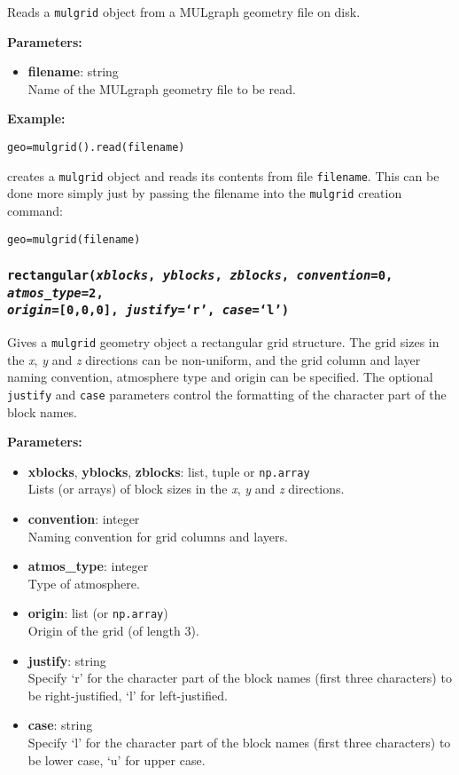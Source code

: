 Reads a \texttt{mulgrid} object from a MULgraph geometry file on disk.

\textbf{Parameters:}
\begin{itemize}
\item \textbf{filename}: string\\
  Name of the MULgraph geometry file to be read.
\end{itemize}

\textbf{Example:}

\begin{verbatim}
geo=mulgrid().read(filename)
\end{verbatim}

creates a \texttt{mulgrid} object and reads its contents from file \texttt{filename}.  This can be done more simply just by passing the filename into the \texttt{mulgrid} creation command:

\begin{verbatim}
geo=mulgrid(filename)
\end{verbatim}

\subsubsection{\texttt{rectangular(\emph{xblocks}, \emph{yblocks}, \emph{zblocks}, \emph{convention}=0, \emph{atmos\_type}=2,\\
    \emph{origin}=[0,0,0], \emph{justify}=`r', \emph{case}=`l')}}

Gives a \texttt{mulgrid} geometry object a rectangular grid structure.  The grid sizes in the \emph{x}, \emph{y} and \emph{z} directions can be non-uniform, and the grid column and layer naming convention, atmosphere type and origin can be specified.  The optional \texttt{justify} and \texttt{case} parameters control the formatting of the character part of the block names.

\textbf{Parameters:}
\begin{itemize}
\item \textbf{xblocks}, \textbf{yblocks}, \textbf{zblocks}: list, tuple or \texttt{np.array}\\
  Lists (or arrays) of block sizes in the \emph{x}, \emph{y} and \emph{z} directions.
\item \textbf{convention}: integer\\
  Naming convention for grid columns and layers.
\item \textbf{atmos\_type}: integer\\
  Type of atmosphere.
\item \textbf{origin}: list (or \texttt{np.array})\\
  Origin of the grid (of length 3).
\item \textbf{justify}: string\\
  Specify `r' for the character part of the block names (first three characters) to be right-justified, `l' for left-justified.
\item \textbf{case}: string\\
  Specify `l' for the character part of the block names (first three characters) to be lower case, `u' for upper case.
\end{itemize}

